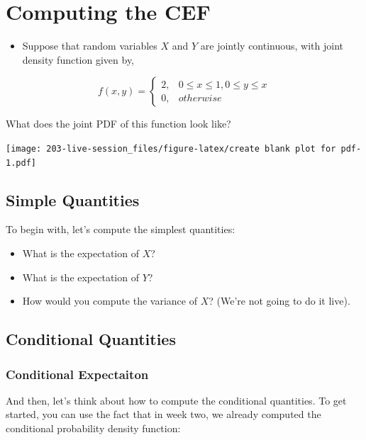 \documentclass[
]{book}
\providecommand{\tightlist}{%
  \setlength{\itemsep}{0pt}\setlength{\parskip}{0pt}}
\theoremstyle{definition}
\theoremstyle{definition}
\theoremstyle{definition}
\theoremstyle{definition}
\theoremstyle{remark}
\begin{document}
\hypertarget{computing-the-cef}{%
\section{Computing the CEF}\label{computing-the-cef}}

\begin{itemize}
\tightlist
\item
  Suppose that random variables \(X\) and \(Y\) are jointly continuous, with joint density function given by,
\end{itemize}

\[
f(x,y) = 
  \begin{cases}
    2, & 0 \leq x \leq 1, 0 \leq y \leq x \\
    0, & otherwise
\end{cases}
\]

What does the joint PDF of this function look like?

\texttt{[image: 203-live-session\_files/figure-latex/create blank plot for pdf-1.pdf]}

\hypertarget{simple-quantities}{%
\subsection{Simple Quantities}\label{simple-quantities}}

To begin with, let's compute the simplest quantities:

\begin{itemize}
\tightlist
\item
  What is the expectation of \(X\)?
\item
  What is the expectation of \(Y\)?
\item
  How would you compute the variance of \(X\)? (We're not going to do it live).
\end{itemize}

\hypertarget{conditional-quantities}{%
\subsection{Conditional Quantities}\label{conditional-quantities}}

\hypertarget{conditional-expectaiton}{%
\subsubsection{Conditional Expectaiton}\label{conditional-expectaiton}}

And then, let's think about how to compute the conditional quantities. To get started, you can use the fact that in week two, we already computed the conditional probability density function:
\end{document}

